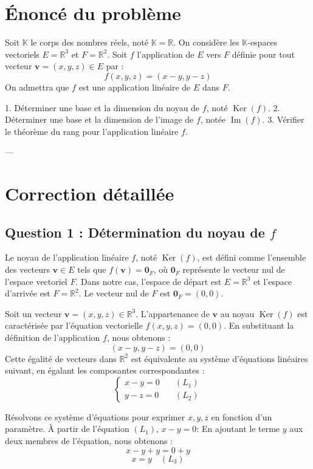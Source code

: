 \documentclass{report}
\begin{document}
\section*{Énoncé du problème}

Soit $\mathbb{K}$ le corps des nombres réels, noté $\mathbb{K} = \mathbb{R}$.
On considère les $\mathbb{K}$-espaces vectoriels $E = \mathbb{R}^3$ et $F = \mathbb{R}^2$.
Soit $f$ l'application de $E$ vers $F$ définie pour tout vecteur $\mathbf{v} = (x,y,z) \in E$ par :
$$ f(x,y,z) = (x-y, y-z) $$
On admettra que $f$ est une application linéaire de $E$ dans $F$.

1.  Déterminer une base et la dimension du noyau de $f$, noté $\operatorname{Ker}(f)$.
2.  Déterminer une base et la dimension de l'image de $f$, notée $\operatorname{Im}(f)$.
3.  Vérifier le théorème du rang pour l'application linéaire $f$.

---

\section*{Correction détaillée}

\subsection*{Question 1 : Détermination du noyau de $f$}

Le noyau de l'application linéaire $f$, noté $\operatorname{Ker}(f)$, est défini comme l'ensemble des vecteurs $\mathbf{v} \in E$ tels que $f(\mathbf{v}) = \mathbf{0}_F$, où $\mathbf{0}_F$ représente le vecteur nul de l'espace vectoriel $F$.
Dans notre cas, l'espace de départ est $E = \mathbb{R}^3$ et l'espace d'arrivée est $F = \mathbb{R}^2$. Le vecteur nul de $F$ est $\mathbf{0}_F = (0,0)$.

Soit un vecteur $\mathbf{v} = (x,y,z) \in \mathbb{R}^3$.
L'appartenance de $\mathbf{v}$ au noyau $\operatorname{Ker}(f)$ est caractérisée par l'équation vectorielle $f(x,y,z) = (0,0)$.
En substituant la définition de l'application $f$, nous obtenons :
$$ (x-y, y-z) = (0,0) $$
Cette égalité de vecteurs dans $\mathbb{R}^2$ est équivalente au système d'équations linéaires suivant, en égalant les composantes correspondantes :
$$ \begin{cases} x - y = 0 & \quad (L_1) \\ y - z = 0 & \quad (L_2) \end{cases} $$

Résolvons ce système d'équations pour exprimer $x, y, z$ en fonction d'un paramètre.
À partir de l'équation $(L_1)$, $x - y = 0$:
En ajoutant le terme $y$ aux deux membres de l'équation, nous obtenons :
$$ x - y + y = 0 + y $$
$$ x = y \quad (L_3) $$
\end{document}
